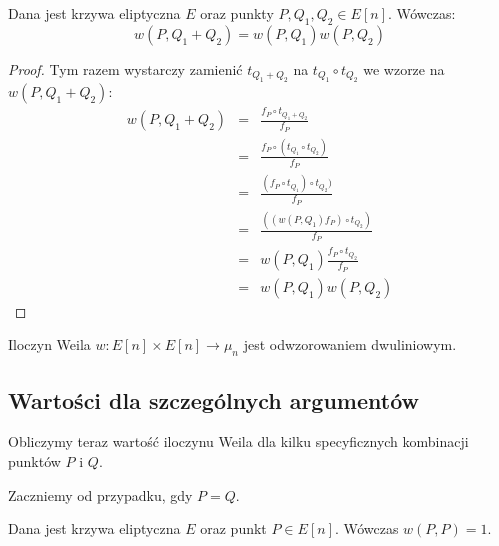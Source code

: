 \begin{lemma}
Dana jest krzywa eliptyczna $E$ oraz punkty $P, Q_1, Q_2 \in E[n]$.
Wówczas:
\begin{equation}
w(P, Q_1 + Q_2) = w(P, Q_1)w(P, Q_2)
\end{equation}
\end{lemma}

\begin{proof}
Tym razem wystarczy zamienić $t_{Q_1 + Q_2}$ na $t_{Q_1} \circ t_{Q_2}$
we wzorze na $w(P, Q_1 + Q_2)$:
\begin{eqnarray*}
w(P, Q_1 + Q_2)
& = & \frac{f_P \circ t_{Q_1 + Q_2}}{f_P} \\
& = & \frac{f_P \circ (t_{Q_1} \circ t_{Q_2})}{f_P} \\
& = & \frac{(f_P \circ t_{Q_1}) \circ t_{Q_2})}{f_P} \\
& = & \frac{((w(P,Q_1)f_P) \circ t_{Q_2})}{f_P} \\
& = & w(P, Q_1)\frac{f_P \circ t_{Q_2}}{f_P} \\
& = & w(P, Q_1)w(P, Q_2)
\end{eqnarray*}
\end{proof}

\begin{corollary}
Iloczyn Weila $w\colon E[n] \times E[n] \to \mu_n$
jest odwzorowaniem dwuliniowym.
\end{corollary}

\subsection*{Wartości dla szczególnych argumentów}

Obliczymy teraz wartość iloczynu Weila
dla kilku specyficznych kombinacji punktów $P$ i $Q$.

Zaczniemy od przypadku, gdy $P = Q$.

\begin{theorem}
Dana jest krzywa eliptyczna $E$ oraz punkt $P \in E[n]$.
Wówczas $w(P, P) = 1$.
\end{theorem}

